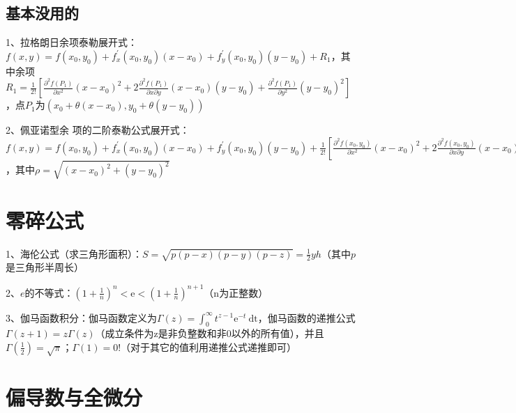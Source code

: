 \subsection{基本没用的}

1、拉格朗日余项泰勒展开式：$f(x, y)=f\left(x_{0}, y_{0}\right)+f_{x}^{\prime}\left(x_{0}, y_{0}\right)\left(x-x_{0}\right)+f_{y}^{\prime}\left(x_{0}, y_{0}\right)\left(y-y_{0}\right)+R_{1}$，其中余项$R_{1}=\frac{1}{2 !}\left[\frac{\partial^{2} f\left(P_{1}\right)}{\partial x^{2}}\left(x-x_{0}\right)^{2}+2 \frac{\partial^{2} f\left(P_{1}\right)}{\partial x \partial y}\left(x-x_{0}\right)\left(y-y_{0}\right)+\frac{\partial^{2} f\left(P_{1}\right)}{\partial y^{2}}\left(y-y_{0}\right)^{2}\right]$，点$P_{1}$为$\left(x_{0}+\theta\left(x-x_{0}\right), y_{0}+\theta\left(y-y_{0}\right)\right)$

2、佩亚诺型余 项的二阶泰勒公式展开式：$f(x, y)=f\left(x_{0}, y_{0}\right)+f_{x}^{\prime}\left(x_{0}, y_{0}\right)\left(x-x_{0}\right)+f_{y}^{\prime}\left(x_{0}, y_{0}\right)\left(y-y_{0}\right)+\frac{1}{2 !}[\frac{\partial^{2} f\left(x_{0}, y_{0}\right)}{\partial x^{2}}\left(x-x_{0}\right)^{2}+2 \frac{\partial^{2} f\left(x_{0}, y_{0}\right)}{\partial x \partial y}\left(x-x_{0}\right)\left(y-y_{0}\right)+\frac{\partial^{2} f\left(x_{0}, y_{0}\right)}{\partial y^{2}}\left(y-y_{0}\right)^{2}]+o\left(\rho^{2}\right)$，其中$\rho=\sqrt{\left(x-x_{0}\right)^{2}+\left(y-y_{0}\right)^{2}}$

\section{零碎公式}

1、海伦公式（求三角形面积）：$S=\sqrt{p(p-x)(p-y)(p-z)}=\frac{1}{2} y h$（其中$p$是三角形半周长）

2、$e$的不等式：$\left(1+\frac{1}{n}\right)^{n}<\mathrm{e}<\left(1+\frac{1}{n}\right)^{n+1}$（n为正整数）

3、伽马函数积分：伽马函数定义为$\Gamma(z)=\int_{0}^{\infty} t^{z-1} \mathrm{e}^{-t} \mathrm{~d} \mathrm{t}$，伽马函数的递推公式$\Gamma(z+1)=z \Gamma(z)$（成立条件为z是非负整数和非0以外的所有值），并且$\Gamma\left(\frac{1}{2}\right) =\sqrt{\pi}$；$\Gamma(1) =0 !$（对于其它的值利用递推公式递推即可）

\section{偏导数与全微分}

